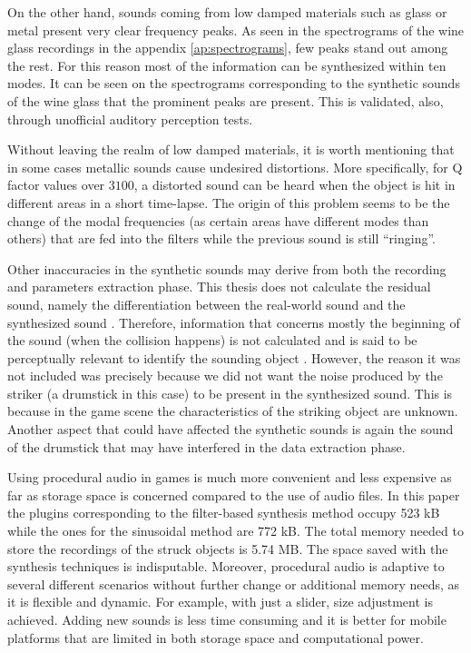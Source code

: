 On the other hand, sounds coming from low damped materials such as glass or metal present very clear frequency peaks. As seen in the spectrograms of the wine glass recordings in the appendix \ref{ap:spectrograms}, few peaks stand out among the rest. For this reason most of the information can be synthesized within ten modes. It can be seen on the spectrograms corresponding to the synthetic sounds of the wine glass that the prominent peaks are present. This is validated, also, through unofficial auditory perception tests. 

Without leaving the realm of low damped materials, it is worth mentioning that in some cases metallic sounds cause undesired distortions. More specifically, for \gls{Q} factor values over $3100$, a distorted sound can be heard when the object is hit in different areas  in a short time-lapse. The origin of this problem seems to be the change of the modal frequencies (as certain areas have different modes than others) that are fed into the filters while the previous sound is still ``ringing''. 


Other inaccuracies in the synthetic sounds may derive from both the recording and parameters extraction phase. This thesis does not calculate the residual sound, namely the differentiation between the real-world sound and the synthesized sound \cite{ren2013example}. Therefore, information that concerns mostly the beginning of the sound (when the collision happens) is not calculated and is said to be perceptually relevant to identify the sounding object \cite{freed1990auditory}. However, the reason it was not included was precisely because we did not want the noise produced by the striker (a drumstick in this case) to be present in the synthesized sound. This is because in the game scene the characteristics of the striking object are unknown. Another aspect that could have affected the synthetic sounds is again the sound of the drumstick that may have interfered in the data extraction phase.

Using procedural audio in games is much more convenient and less expensive as far as storage space is concerned compared to the use of audio files. In this paper the plugins corresponding to the filter-based synthesis method occupy 523 kB while the ones for the sinusoidal method are 772 kB. The total memory needed to store the recordings of the struck objects is 5.74 MB. The space saved with the synthesis techniques is indisputable. Moreover, procedural audio is adaptive to several different scenarios without further change or additional memory needs, as it is flexible and dynamic. For example, with just a slider, size adjustment is achieved.  Adding new sounds is less time consuming and it is better for mobile platforms that are limited in both storage space and computational power.

